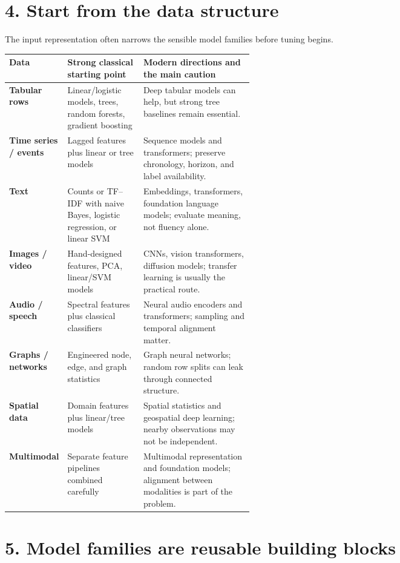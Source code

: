 \section*{4. Start from the data structure}

The input representation often narrows the sensible model families before tuning begins.

\begin{mltable}
\begin{tabularx}{\linewidth}{@{}>{\bfseries\leavevmode\color{MLNavy}}p{0.16\linewidth}p{0.31\linewidth}X@{}}
\toprule
\rowcolor{MLPaleBlue!92}
Data & Strong classical starting point & Modern directions and the main caution \\
\midrule
Tabular rows & Linear/logistic models, trees, random forests, gradient boosting & Deep tabular models can help, but strong tree baselines remain essential. \\
Time series / events & Lagged features plus linear or tree models & Sequence models and transformers; preserve chronology, horizon, and label availability. \\
Text & Counts or TF--IDF with naive Bayes, logistic regression, or linear SVM & Embeddings, transformers, foundation language models; evaluate meaning, not fluency alone. \\
Images / video & Hand-designed features, PCA, linear/SVM models & CNNs, vision transformers, diffusion models; transfer learning is usually the practical route. \\
Audio / speech & Spectral features plus classical classifiers & Neural audio encoders and transformers; sampling and temporal alignment matter. \\
Graphs / networks & Engineered node, edge, and graph statistics & Graph neural networks; random row splits can leak through connected structure. \\
Spatial data & Domain features plus linear/tree models & Spatial statistics and geospatial deep learning; nearby observations may not be independent. \\
Multimodal & Separate feature pipelines combined carefully & Multimodal representation and foundation models; alignment between modalities is part of the problem. \\
\bottomrule
\end{tabularx}
\end{mltable}

\section*{5. Model families are reusable building blocks}

